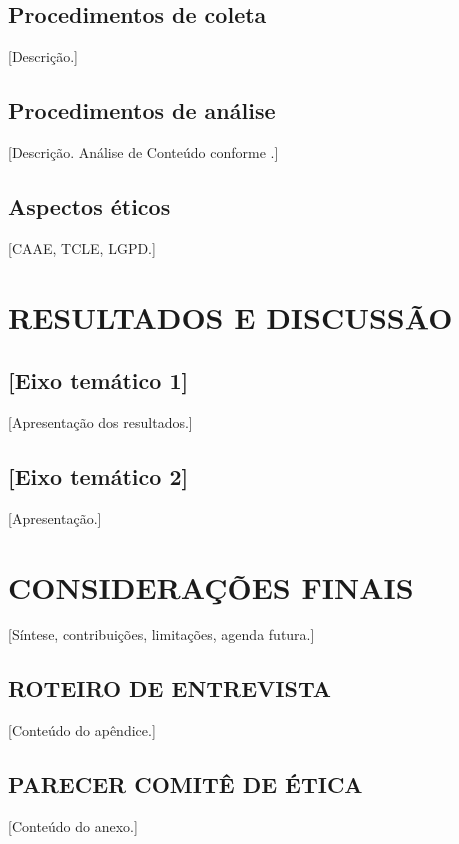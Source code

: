 \documentclass[
    12pt,                       %
    openright,                  %
    twoside,                    %
    a4paper,                    %
    chapter=TITLE,              %
    sumario=tradicional,        %
    section=TITLE,
    english,                    %
    spanish,                    %
    brazil                      %
]{abntex2}
\begin{document}
\section{Procedimentos de coleta}
[Descrição.]

\section{Procedimentos de análise}
[Descrição. Análise de Conteúdo conforme .]

\section{Aspectos éticos}
[CAAE, TCLE, LGPD.]

\chapter{RESULTADOS E DISCUSSÃO}
\label{cap:resultados}

\section{[Eixo temático 1]}
[Apresentação dos resultados.]

\section{[Eixo temático 2]}
[Apresentação.]

\chapter{CONSIDERAÇÕES FINAIS}
\label{cap:conclusao}

[Síntese, contribuições, limitações, agenda futura.]

\postextual



\begin{apendicesenv}
\partapendices

\chapter{ROTEIRO DE ENTREVISTA}
[Conteúdo do apêndice.]

\end{apendicesenv}

\begin{anexosenv}
\partanexos

\chapter{PARECER COMITÊ DE ÉTICA}
[Conteúdo do anexo.]

\end{anexosenv}
\end{document}
